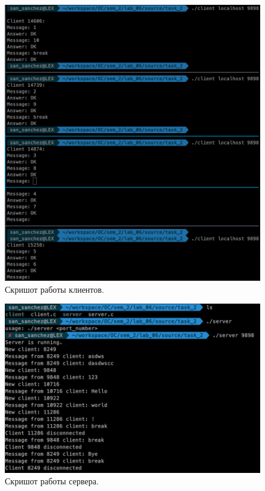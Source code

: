 \begin{figure}[H]
    \centering
    \includegraphics[scale=0.4]{data/image/clietns_1.png}
    \caption{Скришот работы клиентов.}
\end{figure}

\begin{figure}[H]
    \centering
    \includegraphics[scale=0.4]{data/image/server_2.png}
    \caption{Скришот работы сервера.}
\end{figure}

